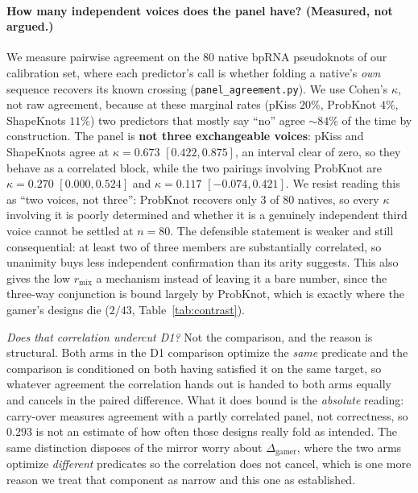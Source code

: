 \documentclass[11pt]{article}
\begin{document}
\paragraph{How many independent voices does the panel have? (Measured, not argued.)} We measure pairwise
agreement on the $80$ native bpRNA pseudoknots of our calibration set, where each predictor's call is whether
folding a native's \emph{own} sequence recovers its known crossing (\texttt{panel\_agreement.py}). We use Cohen's $\kappa$, not raw agreement, because at these marginal rates (pKiss $20\%$, ProbKnot $4\%$,
ShapeKnots $11\%$) two predictors that mostly say ``no'' agree $\sim\!84\%$ of the time by construction. The
panel is \textbf{not three exchangeable voices}: pKiss and ShapeKnots agree at $\kappa=0.673$ $[0.422,0.875]$,
an interval clear of zero, so they behave as a correlated block, while the two pairings involving ProbKnot are
$\kappa=0.270$ $[0.000,0.524]$ and $\kappa=0.117$ $[-0.074,0.421]$. We resist reading this as ``two voices, not
three'': ProbKnot recovers only $3$ of $80$ natives, so every $\kappa$ involving it is poorly determined and
whether it is a genuinely independent third voice cannot be settled at $n{=}80$. The defensible statement is
weaker and still consequential: at least two of three members are substantially correlated, so unanimity buys
less independent confirmation than its arity suggests. This also gives the low $r_{\mathrm{mix}}$ a mechanism
instead of leaving it a bare number, since the three-way conjunction is bound largely by ProbKnot, which is
exactly where the gamer's designs die ($2/43$, Table~\ref{tab:contrast}).

\emph{Does that correlation undercut D1?} Not the comparison, and the reason is structural. Both arms in the D1
comparison optimize the \emph{same} predicate and the comparison is conditioned on both having satisfied it on
the same target, so whatever agreement the correlation hands out is handed to both arms equally and cancels in
the paired difference. What it does bound is the \emph{absolute} reading: carry-over measures agreement with a
partly correlated panel, not correctness, so $0.293$ is not an estimate of how often those designs really fold
as intended. The same distinction disposes of the mirror worry about $\Delta_{\mathrm{gamer}}$, where the two
arms optimize \emph{different} predicates so the correlation does not cancel, which is one more reason we treat
that component as narrow and this one as established.
\end{document}
